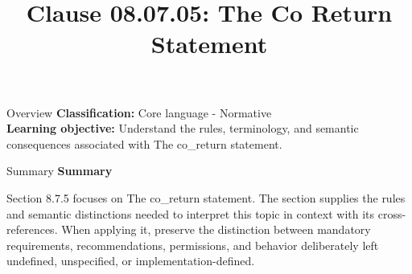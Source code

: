 \documentclass[10pt,letterpaper]{article}
\title{Clause 08.07.05: The Co Return Statement}
\author{}
\date{}
\begin{document}
\maketitle
\begin{CornellOverviewBox}{Overview}
\textbf{Classification:} Core language - Normative\\[2pt]
\textbf{Learning objective:} Understand the rules, terminology, and semantic consequences associated with The co\_return statement.
\end{CornellOverviewBox}\begin{CornellSummaryBox}{Summary}
{\sffamily\bfseries\color{Accent} Summary}\par\vspace{3pt}Section 8.7.5 focuses on The co\_return statement. The section supplies the rules and semantic distinctions needed to interpret this topic in context with its cross-references. When applying it, preserve the distinction between mandatory requirements, recommendations, permissions, and behavior deliberately left undefined, unspecified, or implementation-defined.
\end{CornellSummaryBox}
\end{document}
